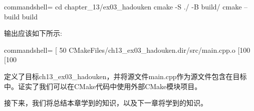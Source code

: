 \begin{tcblisting}{commandshell={}}
cd chapter_13/ex03_hadouken
cmake -S ./ -B build/
cmake --build build
\end{tcblisting}

输出应该如下所示:

\begin{tcblisting}{commandshell={}}
[ 50%
  CMakeFiles/ch13_ex03_hadouken.dir/src/main.cpp.o
[100%
[100%
\end{tcblisting}

定义了目标ch13\_ex03\_hadouken，并将源文件main.cpp作为源文件包含在目标中。证实了我们可以在CMake代码中使用外部CMake模块项目。

接下来，我们将总结本章学到的知识，以及下一章将学到的知识。











